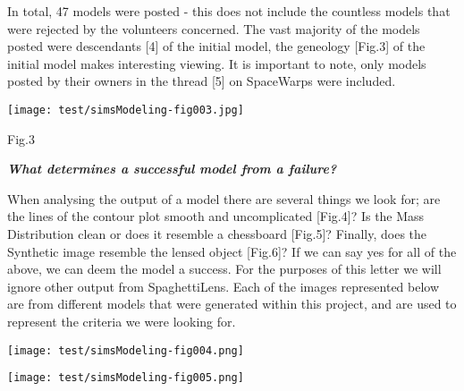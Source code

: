 \documentclass{article}
\begin{document}
In total, 47 models were posted - this does not include the countless models that 
were rejected by the volunteers concerned. The vast majority of the models posted 
were descendants {\small{}[4]} of the initial model, the geneology [Fig.3] of the 
initial model makes interesting viewing. It is important to note, only models posted 
by their owners in the thread {\small{}[5]} on SpaceWarps were included.

\texttt{[image: test/simsModeling-fig003.jpg]}

\vspace{13pt}
Fig.3

\textbf{\emph{What determines a successful model from a failure?}}

When analysing the output of a model there are several things we look for; are 
the lines of the contour plot smooth and uncomplicated [Fig.4]? Is the Mass Distribution 
clean or does it resemble a chessboard [Fig.5]? Finally, does the Synthetic image 
resemble the lensed object [Fig.6]? If we can say yes for all of the above, we 
can deem the model a success. For the purposes of this letter we will ignore other 
output from SpaghettiLens. Each of the images represented below are from different 
models that were generated within this project, and are used to represent the criteria 
we were looking for. 

\texttt{[image: test/simsModeling-fig004.png]}

\texttt{[image: test/simsModeling-fig005.png]}
\end{document}
